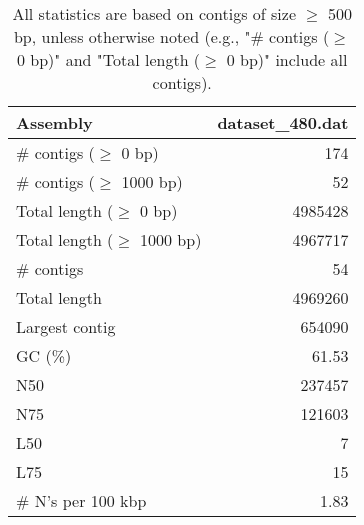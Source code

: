 \documentclass[12pt,a4paper]{article}
\begin{document}
\begin{table}[ht]
\begin{center}
\caption{All statistics are based on contigs of size $\geq$ 500 bp, unless otherwise noted (e.g., "\# contigs ($\geq$ 0 bp)" and "Total length ($\geq$ 0 bp)" include all contigs).}
\begin{tabular}{|l*{1}{|r}|}
\hline
Assembly & dataset\_480.dat \\ \hline
\# contigs ($\geq$ 0 bp) & 174 \\ \hline
\# contigs ($\geq$ 1000 bp) & 52 \\ \hline
Total length ($\geq$ 0 bp) & 4985428 \\ \hline
Total length ($\geq$ 1000 bp) & 4967717 \\ \hline
\# contigs & 54 \\ \hline
Total length & 4969260 \\ \hline
Largest contig & 654090 \\ \hline
GC (\%) & 61.53 \\ \hline
N50 & 237457 \\ \hline
N75 & 121603 \\ \hline
L50 & 7 \\ \hline
L75 & 15 \\ \hline
\# N's per 100 kbp & 1.83 \\ \hline
\end{tabular}
\end{center}
\end{table}
\end{document}
